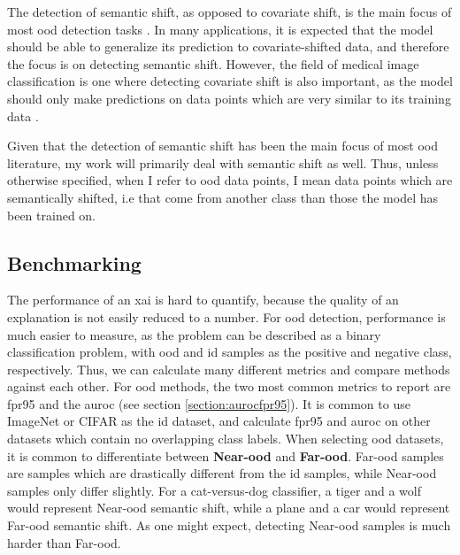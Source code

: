 \documentclass[UKenglish]{uiomasterthesis} %
\theoremstyle{definition}
\begin{document}
The detection of semantic shift, as opposed to covariate shift, is the main focus of most \ac{ood} detection tasks \cite{oodoverview}. In many applications, it is expected that the model should be able to generalize its prediction to covariate-shifted data, and therefore the focus is on detecting semantic shift. However, the field of medical image classification is one where detecting covariate shift is also important, as the model should only make predictions on data points which are very similar to its training data \cite{oodoverview}.

Given that the detection of semantic shift has been the main focus of most \ac{ood} literature, my work will primarily deal with semantic shift as well. Thus, unless otherwise specified, when I refer to \ac{ood} data points, I mean data points which are semantically shifted, i.e that come from another class than those the model has been trained on.

\subsection{Benchmarking}

The performance of an \ac{xai} is hard to quantify, because the quality of an explanation is not easily reduced to a number. For \ac{ood} detection, performance is much easier to measure, as the problem can be described as a binary classification problem, with \ac{ood} and \ac{id} samples as the positive and negative class, respectively. Thus, we can calculate many different metrics and compare methods against each other. For \ac{ood} methods, the two most common metrics to report are \ac{fpr95} and the \ac{auroc} (see section \ref{section:aurocfpr95}). It is common to use ImageNet or CIFAR as the \ac{id} dataset, and calculate \ac{fpr95} and \ac{auroc} on other datasets which contain no overlapping class labels. When selecting \ac{ood} datasets, it is common to differentiate between \textbf{Near-\ac{ood}} and \textbf{Far-\ac{ood}}. Far-\ac{ood} samples are samples which are drastically different from the \ac{id} samples, while Near-\ac{ood} samples only differ slightly. For a cat-versus-dog classifier, a tiger and a wolf would represent Near-\ac{ood} semantic shift, while a plane and a car would represent Far-\ac{ood} semantic shift. As one might expect, detecting Near-\ac{ood} samples is much harder than Far-\ac{ood}.

\end{document}
